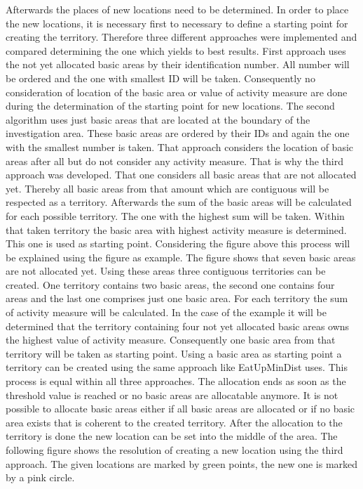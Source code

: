 Afterwards the places of new locations need to be determined. In order to place the new locations, it is necessary first to necessary to define a starting point for creating the territory. Therefore three different approaches were implemented and compared determining the one which yields to best results. First approach uses the not yet allocated basic areas by their identification number. All number will be ordered and the one with smallest ID will be taken. Consequently no consideration of location of the basic area or value of activity measure are done during the determination of the starting point for new locations. The second algorithm uses just basic areas that are located at the boundary of the investigation area. These basic areas are ordered by their IDs and again the one with the smallest number is taken. That approach considers the location of basic areas after all but do not consider any activity measure. That is why the third approach was developed. That one considers all basic areas that are not allocated yet. Thereby all basic areas from that amount which are contiguous will be respected as a territory. Afterwards the sum of the basic areas will be calculated for each possible territory. The one with the highest sum will be taken. Within that taken territory the basic area with highest activity measure is determined. This one is used as starting point. Considering the figure above this process will be explained using the figure as example. The figure shows that seven basic areas are not allocated yet. Using these areas three contiguous territories can be created. One territory contains two basic areas, the second one contains four areas and the last one comprises just one basic area. For each territory the sum of activity measure will be calculated. In the case of the example it will be determined that the territory containing four not yet allocated basic areas owns the highest value of activity measure. Consequently one basic area from that territory will be taken as starting point. Using a basic area as starting point a territory can be created using the same approach like EatUpMinDist uses. This process is equal within all three approaches. The allocation ends as soon as the threshold value is reached or no basic areas are allocatable anymore. It is not possible to allocate basic areas either if all basic areas are allocated or if no basic area exists that is coherent to the created territory. After the allocation to the territory is done the new location can be set into the middle of the area. The following figure shows the resolution of creating a new location using the third approach. The given locations are marked by green points, the new one is marked by a pink circle.

